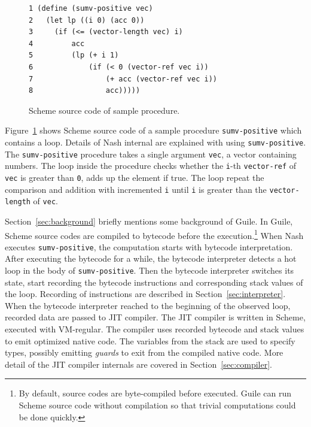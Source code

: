 \documentclass[preprint, 10pt]{sigplanconf}
\begin{document}
\begin{figure}
  \begin{center}
    \small
\begin{verbatim}
1 (define (sumv-positive vec)
2   (let lp ((i 0) (acc 0))
3     (if (<= (vector-length vec) i)
4         acc
5         (lp (+ i 1)
6             (if (< 0 (vector-ref vec i))
7                 (+ acc (vector-ref vec i))
8                 acc)))))
\end{verbatim}
\end{center}
\caption{Scheme source code of sample procedure.}
\label{fig:scmloop}
\end{figure}

Figure~\hyperref[fig:scmloop]{\ref{fig:scmloop}} shows Scheme source code of a
sample procedure \texttt{sumv-positive} which contains a loop. Details of Nash
internal are explained with using \texttt{sumv-positive}. The
\texttt{sumv-positive} procedure takes a single argument \texttt{vec}, a
vector containing numbers. The loop inside the procedure checks whether the
\texttt{i}-th \texttt{vector-ref} of \texttt{vec} is greater than \texttt{0},
adds up the element if true. The loop repeat the comparison and addition with
incremented \texttt{i} until \texttt{i} is greater than the
\texttt{vector-length} of \texttt{vec}.

Section~\hyperref[sec:background]{\ref{sec:background}} briefly mentions some
background of Guile. In Guile, Scheme source codes are compiled to bytecode
before the execution.\footnote{By default, source codes are byte-compiled
  before executed. Guile can run Scheme source code without compilation so
  that trivial computations could be done quickly.} When Nash executes
\texttt{sumv-positive}, the computation starts with bytecode
interpretation. After executing the bytecode for a while, the bytecode
interpreter detects a hot loop in the body of \texttt{sumv-positive}. Then the
bytecode interpreter switches its state, start recording the bytecode
instructions and corresponding stack values of the loop. Recording of
instructions are described in
Section~\hyperref[sec:interpreter]{\ref{sec:interpreter}}. When the bytecode
interpreter reached to the beginning of the observed loop, recorded data are
passed to JIT compiler. The JIT compiler is written in Scheme, executed with
VM-regular. The compiler uses recorded bytecode and stack values to emit
optimized native code. The variables from the stack are used to specify types,
possibly emitting \textit{guards} to exit from the compiled native code. More
detail of the JIT compiler internals are covered in
Section~\hyperref[sec:compiler]{\ref{sec:compiler}}.
\end{document}

